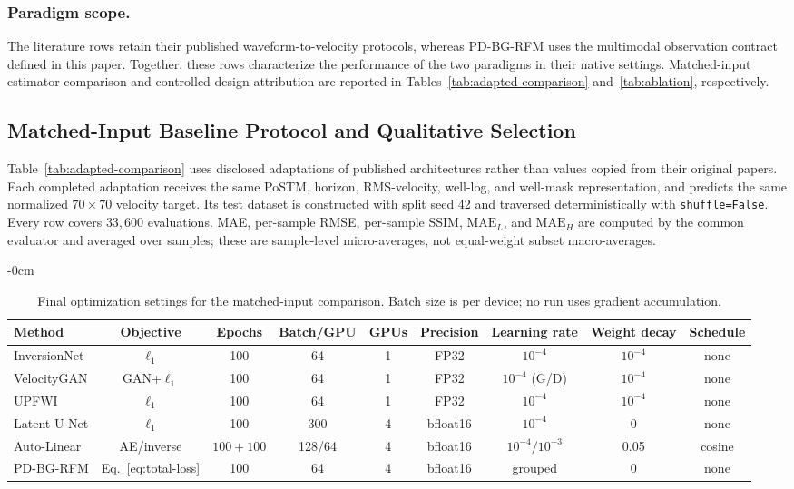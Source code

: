 \subsubsection{Paradigm scope.}
The literature rows retain their published waveform-to-velocity protocols, whereas PD-BG-RFM uses the multimodal observation contract defined in this paper. Together, these rows characterize the performance of the two paradigms in their native settings. Matched-input estimator comparison and controlled design attribution are reported in Tables~\ref{tab:adapted-comparison} and~\ref{tab:ablation}, respectively.


\subsection{Matched-Input Baseline Protocol and Qualitative Selection}
\label{app:adapted-accounting}
Table~\ref{tab:adapted-comparison} uses disclosed adaptations of published architectures rather than values copied from their original papers. Each completed adaptation receives the same PoSTM, horizon, RMS-velocity, well-log, and well-mask representation, and predicts the same normalized $70\times70$ velocity target. Its test dataset is constructed with split seed 42 and traversed deterministically with \texttt{shuffle=False}. Every row covers $33{,}600$ evaluations. MAE, per-sample RMSE, per-sample SSIM, $\mathrm{MAE}_L$, and $\mathrm{MAE}_H$ are computed by the common evaluator and averaged over samples; these are sample-level micro-averages, not equal-weight subset macro-averages.

\begin{table}[t]
\begin{adjustwidth}{-\extralength}{0cm}
\centering
\small
\begin{tabular}{@{}lcccccccc@{}}
\toprule
Method & Objective & Epochs & Batch/GPU & GPUs & Precision & Learning rate & Weight decay & Schedule \\
\midrule
InversionNet & $\ell_1$ & 100 & 64 & 1 & FP32 & $10^{-4}$ & $10^{-4}$ & none \\
VelocityGAN & GAN+$\ell_1$ & 100 & 64 & 1 & FP32 & $10^{-4}$ (G/D) & $10^{-4}$ & none \\
UPFWI & $\ell_1$ & 100 & 64 & 1 & FP32 & $10^{-4}$ & $10^{-4}$ & none \\
Latent U-Net & $\ell_1$ & 100 & 300 & 4 & bfloat16 & $10^{-4}$ & 0 & none \\
Auto-Linear & AE/inverse & $100+100$ & 128/64 & 4 & bfloat16 & $10^{-4}/10^{-3}$ & 0.05 & cosine \\
PD-BG-RFM & Eq.~\ref{eq:total-loss} & 100 & 64 & 4 & bfloat16 & grouped & 0 & none \\
\bottomrule
\end{tabular}
\caption{Final optimization settings for the matched-input comparison. Batch size is per device; no run uses gradient accumulation.}
\label{tab:final-optimization}

\end{adjustwidth}
\end{table}

